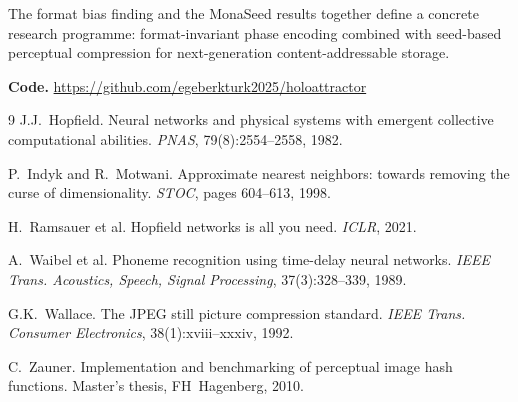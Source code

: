 \documentclass[10pt,twocolumn]{article}
\begin{document}
The format bias finding and the MonaSeed results together define a concrete
research programme: format-invariant phase encoding combined with seed-based
perceptual compression for next-generation content-addressable storage.

\noindent\textbf{Code.}
\url{https://github.com/egeberkturk2025/holoattractor}

\begin{thebibliography}{9}
J.J.~Hopfield. Neural networks and physical systems with emergent collective
computational abilities. \textit{PNAS}, 79(8):2554--2558, 1982.

P.~Indyk and R.~Motwani. Approximate nearest neighbors: towards removing
the curse of dimensionality. \textit{STOC}, pages 604--613, 1998.

H.~Ramsauer et al. Hopfield networks is all you need. \textit{ICLR}, 2021.

A.~Waibel et al. Phoneme recognition using time-delay neural networks.
\textit{IEEE Trans. Acoustics, Speech, Signal Processing}, 37(3):328--339, 1989.

G.K.~Wallace. The JPEG still picture compression standard.
\textit{IEEE Trans. Consumer Electronics}, 38(1):xviii--xxxiv, 1992.

C.~Zauner. Implementation and benchmarking of perceptual image hash
functions. Master's thesis, FH~Hagenberg, 2010.
\end{thebibliography}
\end{document}
